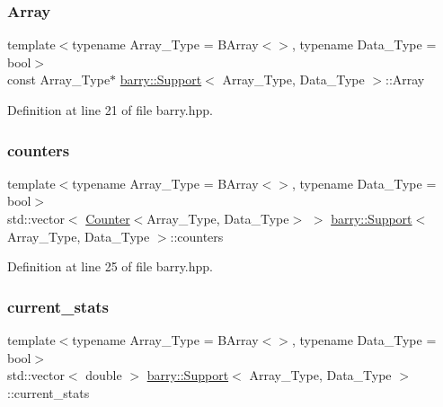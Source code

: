 \subsubsection{\texorpdfstring{Array}{Array}}
{\footnotesize\ttfamily template$<$typename Array\+\_\+\+Type  = B\+Array$<$$>$, typename Data\+\_\+\+Type  = bool$>$ \\
const Array\+\_\+\+Type$\ast$ \hyperlink{classbarry_1_1_support}{barry\+::\+Support}$<$ Array\+\_\+\+Type, Data\+\_\+\+Type $>$\+::Array}



Definition at line 21 of file barry.\+hpp.

\mbox{\label{classbarry_1_1_support_a9615cb720931f81b57d5caa272b969ab}} 
\subsubsection{\texorpdfstring{counters}{counters}}
{\footnotesize\ttfamily template$<$typename Array\+\_\+\+Type  = B\+Array$<$$>$, typename Data\+\_\+\+Type  = bool$>$ \\
std\+::vector$<$ \hyperlink{classbarry_1_1_counter}{Counter}$<$Array\+\_\+\+Type, Data\+\_\+\+Type$>$ $>$ \hyperlink{classbarry_1_1_support}{barry\+::\+Support}$<$ Array\+\_\+\+Type, Data\+\_\+\+Type $>$\+::counters}



Definition at line 25 of file barry.\+hpp.

\mbox{\label{classbarry_1_1_support_a094f0851c7d6bfa7876eb0df2be4439e}} 
\subsubsection{\texorpdfstring{current\+\_\+stats}{current\_stats}}
{\footnotesize\ttfamily template$<$typename Array\+\_\+\+Type  = B\+Array$<$$>$, typename Data\+\_\+\+Type  = bool$>$ \\
std\+::vector$<$ double $>$ \hyperlink{classbarry_1_1_support}{barry\+::\+Support}$<$ Array\+\_\+\+Type, Data\+\_\+\+Type $>$\+::current\+\_\+stats}




